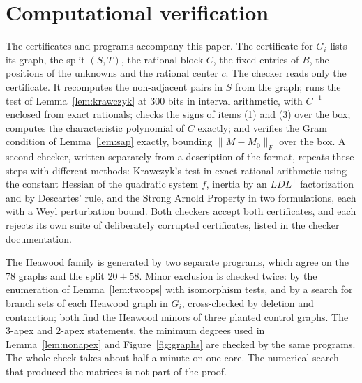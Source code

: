 \documentclass[11pt]{article}
\theoremstyle{remark}
\begin{document}
\section{Computational verification}\label{sec:verification}
The certificates and programs accompany this paper. The certificate for
$G_i$ lists its graph, the split $(S,T)$, the rational block $C$, the fixed
entries of $B$, the positions of the unknowns and the rational center $c$.
The checker reads only the certificate. It recomputes the non-adjacent
pairs in $S$ from the graph; runs the test of Lemma~\ref{lem:krawczyk} at
300 bits in interval arithmetic, with $C^{-1}$ enclosed from exact
rationals; checks the signs of items (1) and (3) over the box; computes the
characteristic polynomial of $C$ exactly; and verifies the Gram condition
of Lemma~\ref{lem:sap} exactly, bounding $\|M-M_0\|_F$ over the box. A
second checker, written separately from a description of the format,
repeats these steps with different methods: Krawczyk's test in exact
rational arithmetic using the constant Hessian of the quadratic system $f$,
inertia by an $LDL^{\mathsf T}$ factorization and by Descartes' rule, and
the Strong Arnold Property in two formulations, each with a Weyl
perturbation bound. Both checkers accept both certificates, and each
rejects its own suite of deliberately corrupted certificates, listed in the
checker documentation.

The Heawood family is generated by two separate programs, which agree on
the 78 graphs and the split $20+58$. Minor exclusion is checked twice: by
the enumeration of Lemma~\ref{lem:twoops} with isomorphism tests, and by a
search for branch sets of each Heawood graph in $G_i$, cross-checked by
deletion and contraction; both find the Heawood minors of three planted
control graphs. The 3-apex and 2-apex statements, the minimum degrees used
in Lemma~\ref{lem:nonapex} and Figure~\ref{fig:graphs} are checked by
the same programs. The whole check takes about half a minute on one core. The
numerical search that produced the matrices is not part of the proof.
\end{document}
